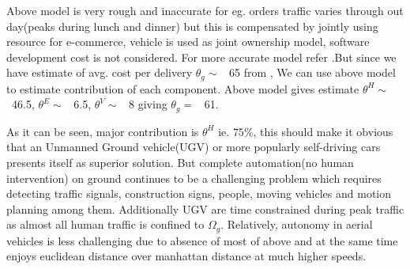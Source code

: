 Above model is very rough and inaccurate for eg. orders traffic varies through out day(peaks during lunch and dinner) but this is compensated by jointly using resource for e-commerce, vehicle is used as joint ownership model, software development cost is not considered. For more accurate model refer \cite{zomato_cost}.But since we have estimate of avg. cost per delivery $\theta_g \sim $ \rupee~65  from \cite{zomato_cost}\cite{office_chai}, We can use above model to estimate contribution of each component. Above model gives estimate \cite{cost_estimate_colab} $\theta^H \sim$ \rupee~46.5, $\theta^E \sim$ \rupee~6.5, $\theta^V \sim$ \rupee~8
giving $\theta_g =$  \rupee~61. 

As it can be seen, major contribution is $\theta^H$ ie. $75\%$, this should make it obvious that an Unmanned Ground vehicle(UGV) or more popularly self-driving cars presents itself as superior solution. But complete automation(no human intervention) on ground continues to be a challenging problem which requires detecting traffic signals, construction signs, people, moving vehicles and motion planning among them. Additionally UGV are time constrained during peak traffic as almost all human traffic is confined to $\Omega_g$. Relatively, autonomy in aerial vehicles is less challenging due to absence of most of above and at the same time enjoys euclidean distance over manhattan distance at much higher speeds.


